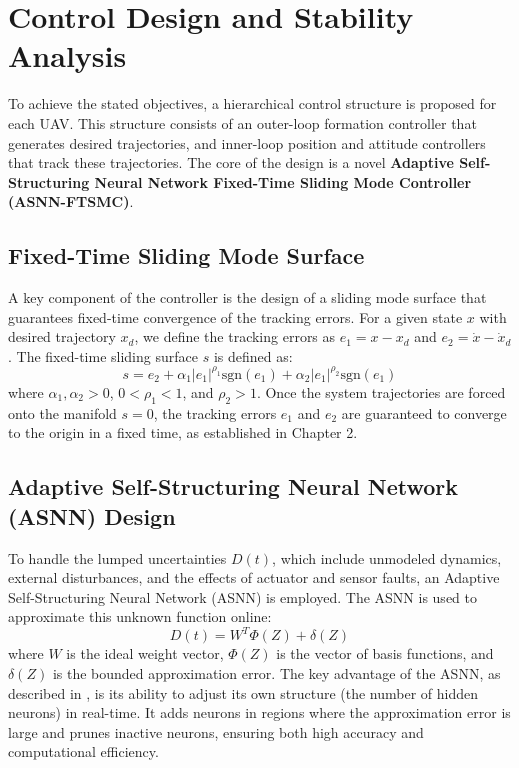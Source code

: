 \section{Control Design and Stability Analysis}
\label{sec:formation_control_design}

To achieve the stated objectives, a hierarchical control structure is proposed for each UAV. This structure consists of an outer-loop formation controller that generates desired trajectories, and inner-loop position and attitude controllers that track these trajectories. The core of the design is a novel \textbf{Adaptive Self-Structuring Neural Network Fixed-Time Sliding Mode Controller (ASNN-FTSMC)}.

\subsection{Fixed-Time Sliding Mode Surface}
\label{subsec:sliding_surface}

A key component of the controller is the design of a sliding mode surface that guarantees fixed-time convergence of the tracking errors. For a given state $x$ with desired trajectory $x_d$, we define the tracking errors as $e_1 = x - x_d$ and $e_2 = \dot{x} - \dot{x}_d$. The fixed-time sliding surface $s$ is defined as:
\begin{equation}
    s = e_2 + \alpha_1 |e_1|^{\rho_1} \text{sgn}(e_1) + \alpha_2 |e_1|^{\rho_2} \text{sgn}(e_1)
    \label{eq:sliding_surface}
\end{equation}
where $\alpha_1, \alpha_2 > 0$, $0 < \rho_1 < 1$, and $\rho_2 > 1$. Once the system trajectories are forced onto the manifold $s=0$, the tracking errors $e_1$ and $e_2$ are guaranteed to converge to the origin in a fixed time, as established in Chapter 2.

\subsection{Adaptive Self-Structuring Neural Network (ASNN) Design}
\label{subsec:asnn_design}

To handle the lumped uncertainties $D(t)$, which include unmodeled dynamics, external disturbances, and the effects of actuator and sensor faults, an Adaptive Self-Structuring Neural Network (ASNN) is employed. The ASNN is used to approximate this unknown function online:
\begin{equation}
    D(t) = W^T \Phi(Z) + \delta(Z)
    \label{eq:asnn_approx}
\end{equation}
where $W$ is the ideal weight vector, $\Phi(Z)$ is the vector of basis functions, and $\delta(Z)$ is the bounded approximation error. The key advantage of the ASNN, as described in \cite{Liu2024Adaptive}, is its ability to adjust its own structure (the number of hidden neurons) in real-time. It adds neurons in regions where the approximation error is large and prunes inactive neurons, ensuring both high accuracy and computational efficiency. 

